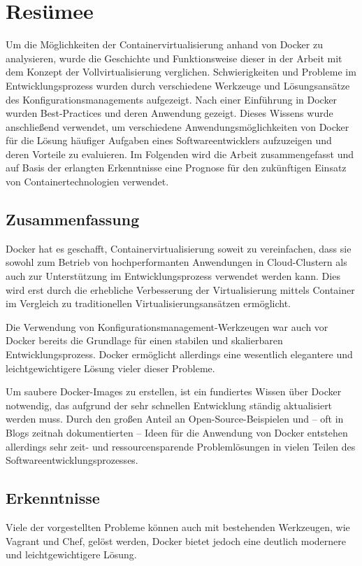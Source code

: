 \chapter{Resümee}
Um die Möglichkeiten der Containervirtualisierung anhand von Docker zu analysieren, wurde die Geschichte und Funktionsweise dieser in der Arbeit mit dem Konzept der Vollvirtualisierung verglichen.
Schwierigkeiten und Probleme im Entwicklungsprozess wurden durch verschiedene Werkzeuge und Lösungsansätze des Konfigurationsmanagements aufgezeigt.
Nach einer Einführung in Docker wurden Best-Practices und deren Anwendung gezeigt.
Dieses Wissens wurde anschließend verwendet, um verschiedene Anwendungsmöglichkeiten von Docker für die Lösung häufiger Aufgaben eines Softwareentwicklers aufzuzeigen und deren Vorteile zu evaluieren.
Im Folgenden wird die Arbeit zusammengefasst und auf Basis der erlangten Erkenntnisse eine Prognose für den zukünftigen Einsatz von Containertechnologien verwendet.

\section{Zusammenfassung}
Docker hat es geschafft, Containervirtualisierung soweit zu vereinfachen, dass sie sowohl zum Betrieb von hochperformanten Anwendungen in Cloud-Clustern als auch zur Unterstützung im Entwicklungsprozess verwendet werden kann.
Dies wird erst durch die erhebliche Verbesserung der Virtualisierung mittels Container im Vergleich zu traditionellen Virtualisierungsansätzen ermöglicht.

Die Verwendung von Konfigurationsmanagement-Werkzeugen war auch vor Docker bereits die Grundlage für einen stabilen und skalierbaren Entwicklungsprozess.
Docker ermöglicht allerdings eine wesentlich elegantere und leichtgewichtigere Lösung vieler dieser Probleme.

Um saubere Docker-Images zu erstellen, ist ein fundiertes Wissen über Docker notwendig, das aufgrund der sehr schnellen Entwicklung ständig aktualisiert werden muss.
Durch den großen Anteil an Open-Source-Beispielen und -- oft in Blogs zeitnah dokumentierten -- Ideen für die Anwendung von Docker entstehen allerdings sehr zeit- und ressourcensparende Problemlösungen in vielen Teilen des Softwareentwicklungsprozesses.

\section{Erkenntnisse}
Viele der vorgestellten Probleme können auch mit bestehenden Werkzeugen, wie \zB Vagrant und Chef, gelöst werden, Docker bietet jedoch eine deutlich modernere und leichtgewichtigere Lösung.

